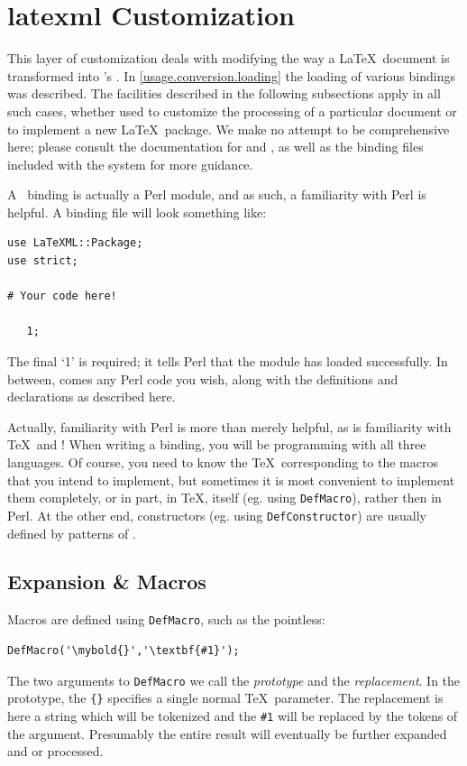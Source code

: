 \documentclass{book}
\newcommand{\ltxcode}{\lstinline[style=latexml]}
\begin{document}
\section{latexml Customization}\label{customization.latexml}
This layer of customization deals with modifying the way a \LaTeX\ document
is transformed into \LaTeXML's \XML.
In \ref{usage.conversion.loading} the loading of various bindings was
described.  The facilities described in the following subsections
apply in all such cases, whether used to customize the processing
of a particular document or to implement a new \LaTeX\ package.
We make no attempt to be comprehensive here; please consult
the documentation for  and ,
as well as the binding files included with the system
for more guidance.

A \LaTeXML\ binding is actually a Perl module, and as such, 
a familiarity with Perl is helpful.
A binding file will look something like:
\begin{lstlisting}[style=latexml]
use LaTeXML::Package;
use strict;

# Your code here!

   1;
\end{lstlisting}
The final `1' is required; it tells Perl that the module has loaded successfully.
In between, comes any Perl code you wish, along with the definitions
and declarations as described here.

Actually, familiarity with Perl is more than merely helpful, as is familiarity
with \TeX\ and \XML! When writing a binding, you will be programming with all
three languages.  Of course, you need to know the \TeX\ corresponding to
the macros that you intend to implement, but sometimes it is most convenient
to implement them completely, or in part, in \TeX, itself (eg. using \ltxcode|DefMacro|),
rather then in Perl. At the other end, constructors (eg. using \ltxcode|DefConstructor|)
are usually defined by patterns of \XML.

\subsection[Expansion]{Expansion \& Macros}\label{customization.latexml.expansion}
Macros are defined using \texttt{DefMacro}, such as the pointless:
\begin{lstlisting}[style=latexml]
  DefMacro('\mybold{}','\textbf{#1}');
\end{lstlisting}
The two arguments to \texttt{DefMacro} we call
the \emph{prototype} and the \emph{replacement}.
In the prototype, the \verb|{}| specifies a single normal \TeX\ parameter.
The replacement is here a string which will
be tokenized and the \verb|#1| will be replaced by the
tokens of the argument. Presumably the entire result will
eventually be further expanded and or processed.
\end{document}

